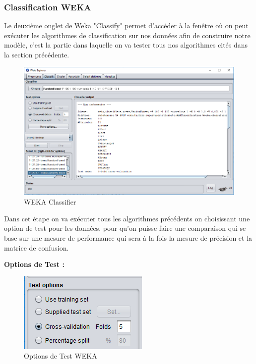 \subsubsection{Classification WEKA}

Le deuxième onglet de Weka "Classify" permet d'accéder à la fenêtre où on peut exécuter les algorithmes de classification sur nos données afin de construire notre modèle, c'est la partie dans laquelle on va tester tous nos algorithmes cités dans la section précédente.

\begin{figure}[H]
\begin{center}
\includegraphics[width=1\linewidth]{images/wekaClassifier.PNG}
\end{center}
\caption{WEKA Classifier}
\label{fig:14}
\end{figure}

Dans cet étape on va exécuter tous les algorithmes précédents on choisissant une option de test pour les données, pour qu'on puisse faire une comparaison qui se base sur une mesure de performance qui sera à la fois la mesure de précision et la matrice de confusion. 

\textbf{Options de Test :}


\begin{figure}[H]
\begin{center}
\includegraphics[width=0.5\linewidth]{images/TestOptions.PNG}
\end{center}
\caption{Options de Test WEKA}
\label{fig:15}
\end{figure}


